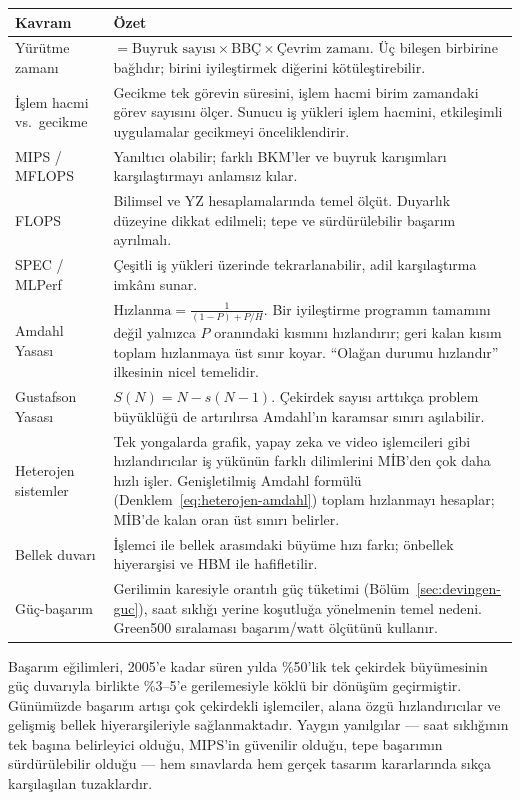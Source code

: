 \begin{center}
\small
\begin{tabular}{lp{9cm}}
\toprule
\textbf{Kavram} & \textbf{Özet} \\
\midrule
Yürütme zamanı & $= \text{Buyruk sayısı} \times \text{BBÇ} \times \text{Çevrim zamanı}$. Üç bileşen birbirine bağlıdır; birini iyileştirmek diğerini kötüleştirebilir. \\
İşlem hacmi vs.\ gecikme & Gecikme tek görevin süresini, işlem hacmi birim zamandaki görev sayısını ölçer. Sunucu iş yükleri işlem hacmini, etkileşimli uygulamalar gecikmeyi önceliklendirir. \\
MIPS / MFLOPS & Yanıltıcı olabilir; farklı BKM'ler ve buyruk karışımları karşılaştırmayı anlamsız kılar. \\
FLOPS & Bilimsel ve YZ hesaplamalarında temel ölçüt. Duyarlık düzeyine dikkat edilmeli; tepe ve sürdürülebilir başarım ayrılmalı. \\
SPEC / MLPerf & Çeşitli iş yükleri üzerinde tekrarlanabilir, adil karşılaştırma imkânı sunar. \\
Amdahl Yasası & $\text{Hızlanma} = \frac{1}{(1-P)+P/H}$. Bir iyileştirme programın tamamını değil yalnızca $P$ oranındaki kısmını hızlandırır; geri kalan kısım toplam hızlanmaya üst sınır koyar. ``Olağan durumu hızlandır'' ilkesinin nicel temelidir. \\
Gustafson Yasası & $S(N) = N - s(N-1)$. Çekirdek sayısı arttıkça problem büyüklüğü de artırılırsa Amdahl'ın karamsar sınırı aşılabilir. \\
Heterojen sistemler & Tek yongalarda grafik, yapay zeka ve video işlemcileri gibi hızlandırıcılar iş yükünün farklı dilimlerini MİB'den çok daha hızlı işler. Genişletilmiş Amdahl formülü (Denklem~\ref{eq:heterojen-amdahl}) toplam hızlanmayı hesaplar; MİB'de kalan oran üst sınırı belirler. \\
Bellek duvarı & İşlemci ile bellek arasındaki büyüme hızı farkı; önbellek hiyerarşisi ve HBM ile hafifletilir. \\
Güç-başarım & Gerilimin karesiyle orantılı güç tüketimi (Bölüm~\ref{sec:devingen-guc}), saat sıklığı yerine koşutluğa yönelmenin temel nedeni. Green500 sıralaması başarım/watt ölçütünü kullanır. \\
\bottomrule
\end{tabular}
\end{center}

Başarım eğilimleri, 2005'e kadar süren yılda \%50'lik tek çekirdek büyümesinin güç duvarıyla birlikte \%3--5'e gerilemesiyle köklü bir dönüşüm geçirmiştir. Günümüzde başarım artışı çok çekirdekli işlemciler, alana özgü hızlandırıcılar ve gelişmiş bellek hiyerarşileriyle sağlanmaktadır. Yaygın yanılgılar --- saat sıklığının tek başına belirleyici olduğu, MIPS'in güvenilir olduğu, tepe başarımın sürdürülebilir olduğu --- hem sınavlarda hem gerçek tasarım kararlarında sıkça karşılaşılan tuzaklardır.


